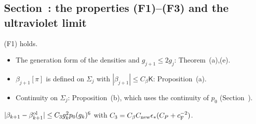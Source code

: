 \subsection{Section~\texorpdfstring{}{58}: the properties (F1)--(F3) and the ultraviolet limit}\label{d11b:58b}

\begin{detail}\label{d11b:F1}
(F1) holds.
\end{detail}

\begin{step}[Proof]
\begin{itemize}
\item The generation form of the densities and $g_{j+1}\le2g_j$: Theorem~(a),(e).
\item $\beta_{j+1}[\pi]$ is defined on $\Sigma_j$ with $|\beta_{j+1}|\le C_\beta\mathsf K$: Proposition~(a).
\item Continuity on $\Sigma_j$: Proposition~(b), which uses the continuity of $p_0$ (Section~).
\end{itemize}
\end{step}

\begin{detail}\label{d11b:F3}
$|\beta_{k+1}-\beta^{\rm ol}_{k+1}|\le C_3g_k^2p_0(g_k)^6$ with $C_3=C_\beta C_{\rm new}\epsilon_*(C_P+c_{\rm F}^{-2})$.
\end{detail}

